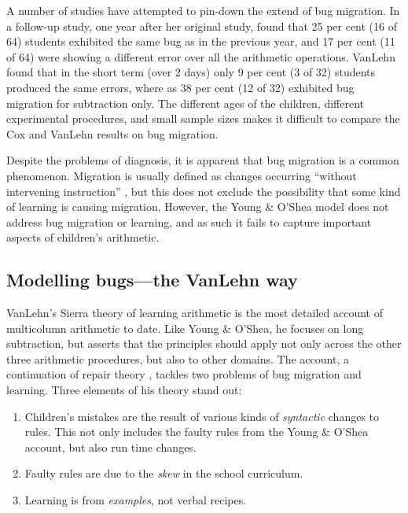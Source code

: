 A number of studies have attempted to pin-down the extend of bug
migration.
In a follow-up study, one year after her original study,
 found that 25 per cent (16 of 64) students exhibited the
same bug as in the previous year,
and 17 per cent (11 of 64) were showing a different error
over all the arithmetic operations.
VanLehn \citeyear{vanlbugs,mindbugs}
found
that in the short term (over 2 days) only 9 per cent (3 of 32) students
produced the same errors, where as 38 per cent (12 of 32) exhibited bug
migration for subtraction only.  The different ages of the children,
different experimental procedures, and small sample sizes makes it
difficult to compare the Cox and VanLehn results on bug migration.

Despite the problems of diagnosis, it is apparent that bug migration is
a common phenomenon.  Migration is usually defined as changes occurring
``without intervening instruction'' \cite[p.~54]{mindbugs}, but this does
not exclude the possibility that some kind of learning is causing
migration.
However, the
Young \& O'Shea model does not address bug migration or
learning, and as such it fails to capture important aspects of children's
arithmetic.


\subsection{Modelling bugs---the VanLehn way}\label{s:sierra}

VanLehn's \citeyear{mindbugs} Sierra theory of learning arithmetic is
the most detailed account of multicolumn arithmetic to date.  Like Young
\& O'Shea, he
focuses
on long subtraction, but asserts that the principles should apply not
only across the other three arithmetic procedures, but also to other
domains. The account, a continuation of repair theory \cite{repair},
tackles two
problems of bug migration and learning. Three elements of his
theory stand out:
\begin{enumerate}
\item Children's mistakes are the result of various kinds of
{\em syntactic} changes to rules.  This not only includes the faulty
rules from the Young \& O'Shea account, but also run time changes.
\item Faulty rules are due to the {\em skew} in the school curriculum.
\item Learning is from {\em examples}, not verbal recipes.
\end{enumerate}


